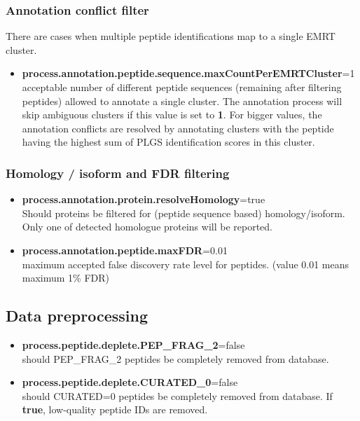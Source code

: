 \documentclass[]{article}
\providecommand{\tightlist}{%
  \setlength{\itemsep}{0pt}\setlength{\parskip}{0pt}}
\begin{document}
\subsubsection{Annotation conflict
filter}\label{annotation-conflict-filter}

There are cases when multiple peptide identifications map to a single
EMRT cluster.

\begin{itemize}
\tightlist
\item
  \textbf{process.annotation.peptide.sequence.maxCountPerEMRTCluster}=1\\
  acceptable number of different peptide sequences (remaining after
  filtering peptides) allowed to annotate a single cluster. The
  annotation process will skip ambiguous clusters if this value is set
  to \textbf{1}. For bigger values, the annotation conflicts are
  resolved by annotating clusters with the peptide having the highest
  sum of PLGS identification scores in this cluster.
\end{itemize}

\subsubsection{Homology / isoform and FDR
filtering}\label{homology-isoform-and-fdr-filtering}

\begin{itemize}
\tightlist
\item
  \textbf{process.annotation.protein.resolveHomology}=true\\
  Should proteins be filtered for (peptide sequence based)
  homology/isoform. Only one of detected homologue proteins will be
  reported.
\item
  \textbf{process.annotation.peptide.maxFDR}=0.01\\
  maximum accepted false discovery rate level for peptides. (value 0.01
  means maximum 1\% FDR)
\end{itemize}

\subsection{Data preprocessing}\label{data-preprocessing}

\begin{itemize}
\tightlist
\item
  \textbf{process.peptide.deplete.PEP\_FRAG\_2}=false\\
  should PEP\_FRAG\_2 peptides be completely removed from database.
\item
  \textbf{process.peptide.deplete.CURATED\_0}=false\\
  should CURATED=0 peptides be completely removed from database. If
  \textbf{true}, low-quality peptide IDs are removed.
\end{itemize}
\end{document}
